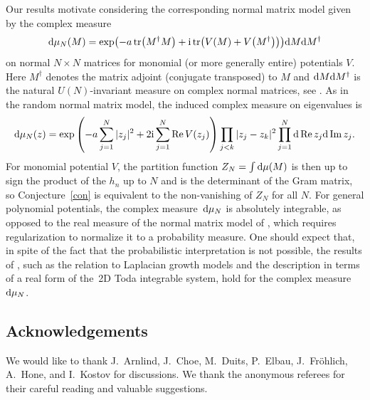 \documentclass[pdftex]{sigma}
\numberwithin{equation}{section}
\theoremstyle{definition}
\begin{document}
Our results motivate considering the corresponding normal matrix model given by the complex measure
\[
 {\rm d}\mu_N(M)=\exp\bigl(-a\operatorname{tr}\bigl(M^\dagger M\bigr)+{\rm i}\operatorname{tr}\bigl(V(M)+V\bigl(M^\dagger\bigr)\bigr)\bigr){\rm d}M{\rm d}M^\dagger
\]
on normal $N\times N$ matrices for monomial (or more generally entire) potentials $V$. Here $M^\dagger$ denotes the matrix adjoint (conjugate transposed) to $M$ and ${\rm d}M{\rm d}M^\dagger$ is the natural $U(N)$-invariant measure on complex normal matrices, see \cite{ElbauFelder2005,WiegmannZabrodin2000}.
As in the random normal matrix model, the induced complex measure on eigenvalues is
\[
 {\rm d}\mu_N(z)=\exp\left(-a\sum_{j=1}^N|z_j|^2+2{\rm i}\sum_{j=1}^N\operatorname{Re} V(z_j)\right)\prod_{j<k}|z_j-z_k|^2\prod_{j=1}^N
 {\rm d}\operatorname{Re}z_j{\rm d}\operatorname{Im} z_j.
\]
For monomial potential $V$, the partition function $Z_N=\int{\rm d}\mu(M)$ is then up to sign the product of the $h_n$ up to $N$ and is the determinant of the Gram matrix, so Conjecture~\ref{con} is equivalent to the non-vanishing of $Z_N$ for all $N$.
For general polynomial potentials, the complex measure~${\rm d}\mu_N$ is absolutely integrable, as opposed to the real measure
of the normal matrix model of \cite{WiegmannZabrodin2000}, which requires regularization \cite{BleherKuijlaars2012,ElbauFelder2005} to normalize it to a probability measure.
One should expect that, in spite of the fact that the probabilistic interpretation
is not possible, the results of \cite{WiegmannZabrodin2000}, such as the relation to Laplacian growth models and
the description in terms of a real form of the~2D Toda integrable system, hold for the complex measure ${\rm d}\mu_N$.

\subsection*{Acknowledgements} We would like to thank J.~Arnlind, J.~Choe, M.~Duits, P.~Elbau, J.~Fr\"ohlich, A.~Hone, and I.~Kostov for discussions. We thank the anonymous referees for their careful reading and valuable suggestions.
\end{document}
